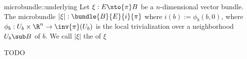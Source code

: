 \begin{myexample}{microbundle::underlying}
    Let $\xi: E \xto{\pi} B$ be a $n$-dimensional vector bundle.
    The microbundle $\lvert \xi \rvert: \bundle{B}{E}{i}{\pi}$ where $i(b) := \phi_b(b, 0)$, where
    $\phi_b: U_b \times \R^n \to \inv{\pi}(U_b)$ is the local trivialization over a
    neighborhood $U_b \sub B$ of $b$. We call $\lvert \xi \rvert$ the  of $\xi$
\end{myexample}

\begin{myproof}
    TODO
\end{myproof}